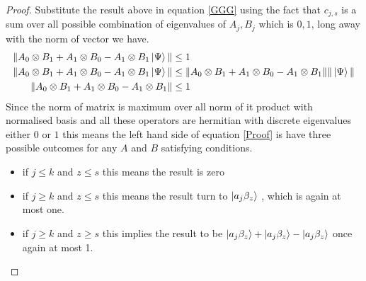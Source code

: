 \begin{proof}
Substitute the result above in equation \ref{GGG}  using the fact that $c_{j,s}$ is a sum over all possible combination of eigenvalues of $A_j,B_j$ which is $0,1$, long away with the  norm of vector we have.
\begin{align}\label{Proof}
\| A_0\otimes B_1+A_1\otimes B_0-A_1\otimes B_1 \ket{\Psi} \| & \leq 1\nonumber\\
\| A_0\otimes B_1+A_1\otimes B_0-A_1\otimes B_1 \ket{\Psi} \|& \leq \| A_0\otimes B_1+A_1\otimes B_0-A_1\otimes B_1\| \| \ket{\Psi} \|\nonumber\\
\| A_0\otimes B_1+A_1\otimes B_0-A_1\otimes B_1\|& \leq  1
\end{align}
Since the norm of matrix is maximum over all norm of it product with normalised basis and all these operators are hermitian with discrete eigenvalues either $0$ or $1$ this means the left hand side of equation \ref{Proof} is have three possible outcomes for any $A$ and $B$ satisfying conditions.
\begin{itemize}
\item if $j\leq k$ and $z\leq s$ this means the result is zero
\item if $j\geqslant k$ and $z\leq s$ this means the result turn to $\ket{a_j \beta_z}$ , which is again at most one.
\item if $j\geqslant k$ and $z\geqslant s$ this implies the result to be $\ket{a_j \beta_z}+ \ket{a_j \beta_z}- \ket{a_j \beta_z}$ once again at most 1.
\end{itemize}
\end{proof}